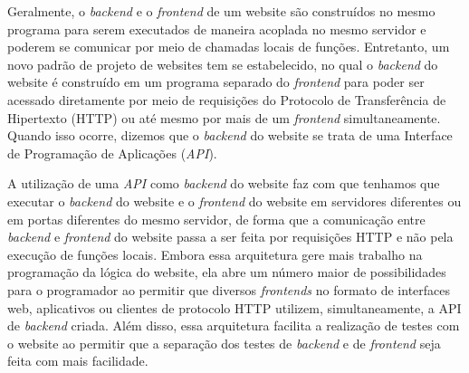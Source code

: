 Geralmente, o \textit{backend} e o \textit{frontend} de um website são construídos no mesmo programa para serem executados de maneira acoplada no mesmo servidor e poderem se comunicar por meio de chamadas locais de funções. Entretanto, um novo padrão de projeto de websites tem se estabelecido, no qual o \textit{backend} do website é construído em um programa separado do \textit{frontend} para poder ser acessado diretamente por meio de requisições do Protocolo de Transferência de Hipertexto (HTTP) ou até mesmo por mais de um \textit{frontend} simultaneamente. Quando isso ocorre, dizemos que o \textit{backend} do website se trata de uma Interface de Programação de Aplicações (\textit{API}).

A utilização de uma \textit{API} como \textit{backend} do website faz com que tenhamos que executar o \textit{backend} do website e o \textit{frontend} do website em servidores diferentes ou em portas diferentes do mesmo servidor, de forma que a comunicação entre \textit{backend} e \textit{frontend} do website passa a ser feita por requisições HTTP e não pela execução de funções locais. Embora essa arquitetura gere mais trabalho na programação da lógica do website, ela abre um número maior de possibilidades para o programador ao permitir que diversos \textit{frontends} no formato de interfaces web, aplicativos ou clientes de protocolo HTTP utilizem, simultaneamente, a API de \textit{backend} criada. Além disso, essa arquitetura facilita a realização de testes com o website ao permitir que a separação dos testes de \textit{backend} e de \textit{frontend} seja feita com mais facilidade.
